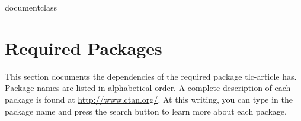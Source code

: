 documentclass\documentclass[12pt]{tlc-article}
\begin{document}
\clearpage
\section{Required Packages}
This section documents the dependencies of the required package tlc-article has.
Package names are listed in alphabetical order. A complete description of each
package is found at \url{http://www.ctan.org/}. At this writing, you can type in
the package name and press the search button to learn more about each package.

\csvreader[tlcPkgStyle, separator=pipe]{\tlcPkgFile}{}{\name & \description}
\end{document}
